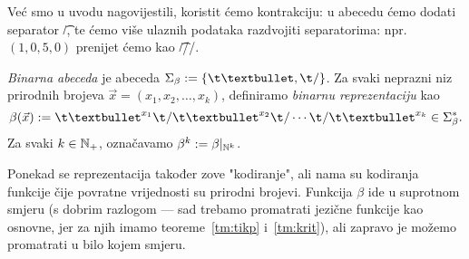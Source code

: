 
Već smo u uvodu nagovijestili, koristit ćemo kontrakciju: u abecedu ćemo dodati separator \t/, te ćemo više ulaznih podataka razdvojiti separatorima: npr.\ $(1,0,5,0)$ prenijet ćemo kao \t{\textbullet//\textbullet\textbullet\textbullet\textbullet\textbullet/}.

\begin{definicija}\label{def:beta}
\emph{Binarna abeceda} je abeceda $\Sigma_\beta:=\{\t\textbullet,\t/\}$. Za svaki neprazni niz prirodnih brojeva $\vec x=(x_1,x_2,\dotsc,x_k)$, definiramo \emph{binarnu reprezentaciju} kao
\begin{equation}\label{eq:betadef}
    \beta(\vec x):=\t\textbullet^{x_1}\t/\t\textbullet^{x_2}\t/\dotsm\t/\t\textbullet^{x_k}\in\Sigma_\beta^*\text.
\end{equation}
Za svaki $k\in{\mathbb N}_+$, označavamo $\beta^k:=\beta|_{{\mathbb N}^k}$.
\end{definicija}

Ponekad se reprezentacija također zove "kodiranje", ali nama su kodiranja funkcije čije povratne vrijednosti su prirodni brojevi. Funkcija $\beta$ ide u suprotnom smjeru (s dobrim razlogom --- sad trebamo promatrati jezične funkcije kao osnovne, jer za njih imamo teoreme~\ref{tm:tikp} i~\ref{tm:krit}), ali zapravo je možemo promatrati u bilo kojem smjeru.

